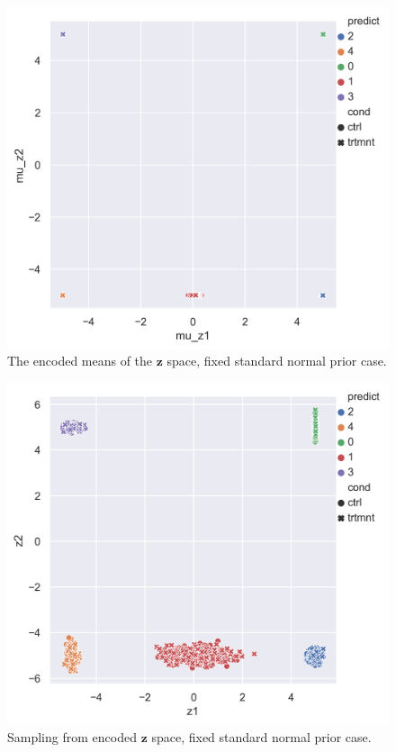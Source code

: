 \documentclass[11pt, a4paper]{report}
\theoremstyle{plain}
\theoremstyle{definition}
\theoremstyle{remark}
\newcommand{\z}{\mathbf{z}}
\begin{document}
\begin{figure}[h]
\centering
\includegraphics[width=1.1\textwidth]{images/blobs_cgmvae_stdprior_mu_z.png}
\caption{The encoded means of the $\z$ space, fixed standard normal prior case.
}
\label{fig:blobs_nop_muz}
\end{figure}


\begin{figure}[h]
\centering
\includegraphics[width=1.1\textwidth]{images/blobs_cgmvae_stdprior_z.png}
\caption{Sampling from encoded $\z$ space, fixed standard normal prior case.
}
\label{fig:blobs_nop_z}
\end{figure}
\end{document}

